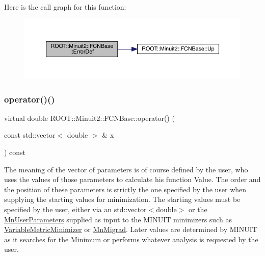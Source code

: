 Here is the call graph for this function\+:
\nopagebreak
\begin{figure}[H]
\begin{center}
\leavevmode
\includegraphics[width=350pt]{dd/df4/classROOT_1_1Minuit2_1_1FCNBase_ac4592475c58a65b037ba97ab5f3cba10_cgraph}
\end{center}
\end{figure}
\mbox{\label{classROOT_1_1Minuit2_1_1FCNBase_ae4a86bd94d0d0f5ca6fc8f8ab2bb43cd}} 
\subsubsection{\texorpdfstring{operator()()}{operator()()}\hspace{0.1cm}{\footnotesize\ttfamily [1/3]}}
{\footnotesize\ttfamily virtual double R\+O\+O\+T\+::\+Minuit2\+::\+F\+C\+N\+Base\+::operator() (\begin{DoxyParamCaption}\item[{const std\+::vector$<$ double $>$ \&}]{x }\end{DoxyParamCaption}) const\hspace{0.3cm}{\ttfamily [pure virtual]}}

The meaning of the vector of parameters is of course defined by the user, who uses the values of those parameters to calculate his function Value. The order and the position of these parameters is strictly the one specified by the user when supplying the starting values for minimization. The starting values must be specified by the user, either via an std\+::vector$<$double$>$ or the \mbox{\hyperlink{classROOT_1_1Minuit2_1_1MnUserParameters}{Mn\+User\+Parameters}} supplied as input to the M\+I\+N\+U\+IT minimizers such as \mbox{\hyperlink{classROOT_1_1Minuit2_1_1VariableMetricMinimizer}{Variable\+Metric\+Minimizer}} or \mbox{\hyperlink{classROOT_1_1Minuit2_1_1MnMigrad}{Mn\+Migrad}}. Later values are determined by M\+I\+N\+U\+IT as it searches for the Minimum or performs whatever analysis is requested by the user.



